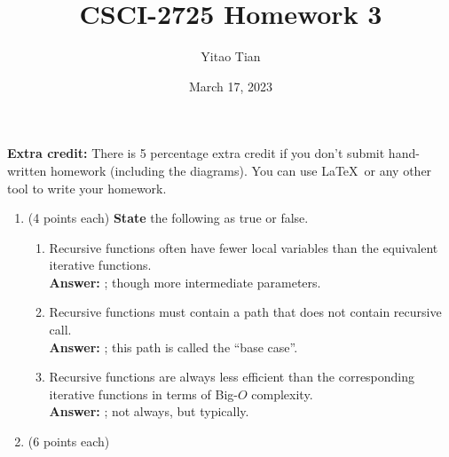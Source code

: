 \documentclass[12pt, a4paper]{article}
\title{CSCI-2725 Homework 3}
\author{Yitao Tian}
\date{March 17, 2023}
\begin{document}
\maketitle

\textbf{Extra credit:} There is 5 percentage extra credit if you don't submit hand-written homework (including the diagrams).
You can use \LaTeX\ or any other tool to write your homework.

\begin{enumerate}

    \item (4 points each) \textbf{State} the following as true or false.
    \begin{enumerate}
    
        \item Recursive functions often have fewer local variables than the equivalent iterative functions. \\
        \hspace*{\fill} \textbf{Answer:} ; though more intermediate parameters.

        \item Recursive functions must contain a path that does not contain recursive call. \\
        \hspace*{\fill} \textbf{Answer:} ; this path is called the ``base case''.
        
        \item Recursive functions are always less efficient than the corresponding iterative functions in terms of Big-$O$ complexity. \\
        \hspace*{\fill} \textbf{Answer:} ; not always, but typically.
    
    \end{enumerate}



    \newpage


    
    \item (6 points each)
       

\end{enumerate}
\end{document}
